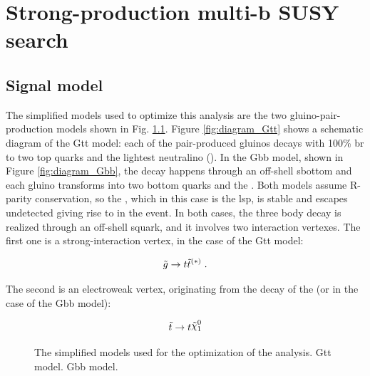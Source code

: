 \chapter{Strong-production multi-b SUSY search}
\label{chap:strong_prod}


\section{Signal model}

The simplified models used to optimize this analysis are the two gluino-pair-production models shown in Fig. \ref{fig:strong_diagram}. 
Figure \ref{fig:diagram_Gtt} shows a schematic diagram of the Gtt model: 
each of the pair-produced gluinos decays with 100\% \gls{br} to two top quarks and the lightest neutralino (\ninoone).
In the Gbb model, shown in Figure \ref{fig:diagram_Gbb}, the decay happens through an off-shell sbottom and each gluino transforms into 
two bottom quarks and the \ninoone. Both models assume R-parity conservation, so the \ninoone, which in this case is the \gls{lsp}, is stable 
and escapes undetected giving rise to \met in the event. In both cases, the three body decay is realized through an off-shell squark, 
and it involves two interaction vertexes. The first one is a strong-interaction vertex, in the case of the Gtt model:

\begin{equation*}
\tilde{g} \to t \tilde{t}^{(*)} \; .
\end{equation*}

\noindent The second is an electroweak vertex, originating from the decay of the \stop (or \sbottom in the case of the Gbb model):

\begin{equation*}
\stop \to t \ninoone
\end{equation*}

\begin{figure}[h]
\centering 
{}
\caption{The simplified models used for the optimization of the analysis.  Gtt model.  Gbb model.
}\label{fig:strong_diagram}
\end{figure}

